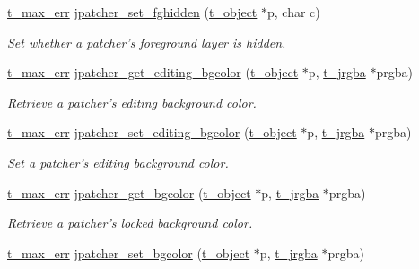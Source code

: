 \begin{DoxyCompactItemize}
\hyperlink{group__datatypes_ga73edaae82b318855cc09fac994918165}{t\_\-max\_\-err} \hyperlink{group__jpatcher_ga905d41f7b001aa779374307b67a07495}{jpatcher\_\-set\_\-fghidden} (\hyperlink{structt__object}{t\_\-object} $\ast$p, char c)
\begin{DoxyCompactList}\small\item\em Set whether a patcher's foreground layer is hidden. \item\end{DoxyCompactList}\item 
\hyperlink{group__datatypes_ga73edaae82b318855cc09fac994918165}{t\_\-max\_\-err} \hyperlink{group__jpatcher_ga66ac15a412d7fa918471a49e341a93fa}{jpatcher\_\-get\_\-editing\_\-bgcolor} (\hyperlink{structt__object}{t\_\-object} $\ast$p, \hyperlink{structt__jrgba}{t\_\-jrgba} $\ast$prgba)
\begin{DoxyCompactList}\small\item\em Retrieve a patcher's editing background color. \item\end{DoxyCompactList}\item 
\hyperlink{group__datatypes_ga73edaae82b318855cc09fac994918165}{t\_\-max\_\-err} \hyperlink{group__jpatcher_ga3e0e7d12c6e30c582fbd3da059eaca58}{jpatcher\_\-set\_\-editing\_\-bgcolor} (\hyperlink{structt__object}{t\_\-object} $\ast$p, \hyperlink{structt__jrgba}{t\_\-jrgba} $\ast$prgba)
\begin{DoxyCompactList}\small\item\em Set a patcher's editing background color. \item\end{DoxyCompactList}\item 
\hyperlink{group__datatypes_ga73edaae82b318855cc09fac994918165}{t\_\-max\_\-err} \hyperlink{group__jpatcher_gac08bdf16f3f65b962cdfbe2b5aa59ab0}{jpatcher\_\-get\_\-bgcolor} (\hyperlink{structt__object}{t\_\-object} $\ast$p, \hyperlink{structt__jrgba}{t\_\-jrgba} $\ast$prgba)
\begin{DoxyCompactList}\small\item\em Retrieve a patcher's locked background color. \item\end{DoxyCompactList}\item 
\hyperlink{group__datatypes_ga73edaae82b318855cc09fac994918165}{t\_\-max\_\-err} \hyperlink{group__jpatcher_ga2ddf7d6edaf305c425108a96cb32b62d}{jpatcher\_\-set\_\-bgcolor} (\hyperlink{structt__object}{t\_\-object} $\ast$p, \hyperlink{structt__jrgba}{t\_\-jrgba} $\ast$prgba)

\end{DoxyCompactItemize}
